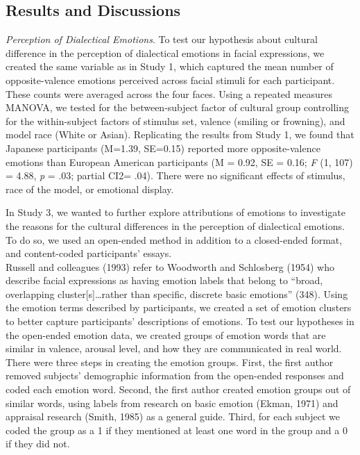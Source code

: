 \documentclass[english,man]{apa6}
\newcounter{author}
\begin{document}
\subsection{Results and Discussions}\label{results-and-discussions-1}

\emph{Perception of Dialectical Emotions}. To test our hypothesis about
cultural difference in the perception of dialectical emotions in facial
expressions, we created the same variable as in Study 1, which captured
the mean number of opposite-valence emotions perceived across facial
stimuli for each participant. These counts were averaged across the four
faces. Using a repeated measures MANOVA, we tested for the
between-subject factor of cultural group controlling for the
within-subject factors of stimulus set, valence (smiling or frowning),
and model race (White or Asian). Replicating the results from Study 1,
we found that Japanese participants (M=1.39, SE=0.15) reported more
opposite-valence emotions than European American participants (M = 0.92,
SE = 0.16; \emph{F} (1, 107) = 4.88, \emph{p} = .03; partial CI2= .04).
There were no significant effects of stimulus, race of the model, or
emotional display.

In Study 3, we wanted to further explore attributions of emotions to
investigate the reasons for the cultural differences in the perception
of dialectical emotions. To do so, we used an open-ended method in
addition to a closed-ended format, and content-coded participants'
essays.\\Russell and colleagues (1993) refer to Woodworth and Schlosberg
(1954) who describe facial expressions as having emotion labels that
belong to \enquote{broad, overlapping cluster{[}s{]}\ldots{}rather than
specific, discrete basic emotions} (348). Using the emotion terms
described by participants, we created a set of emotion clusters to
better capture participants' descriptions of emotions. To test our
hypotheses in the open-ended emotion data, we created groups of emotion
words that are similar in valence, arousal level, and how they are
communicated in real world. There were three steps in creating the
emotion groups. First, the first author removed subjects' demographic
information from the open-ended responses and coded each emotion word.
Second, the first author created emotion groups out of similar words,
using labels from research on basic emotion (Ekman, 1971) and appraisal
research (Smith, 1985) as a general guide. Third, for each subject we
coded the group as a 1 if they mentioned at least one word in the group
and a 0 if they did not.
\end{document}
